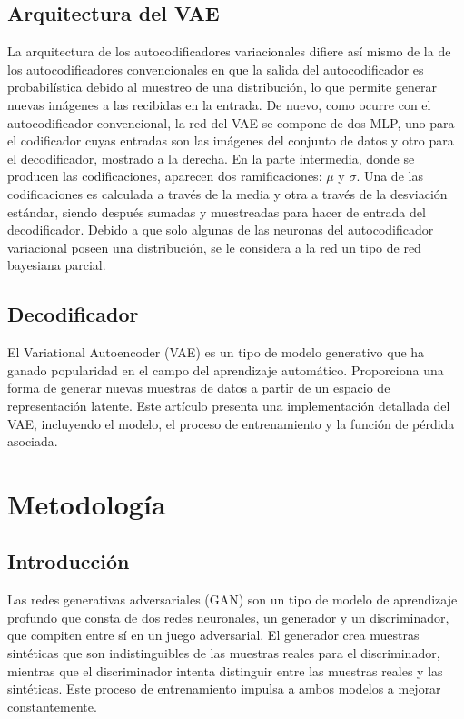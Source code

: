 \subsection{Arquitectura del VAE}\label{sec:arquitectura del vae}
La arquitectura de los autocodificadores variacionales difiere así mismo de la de
los autocodificadores convencionales en que la salida del autocodificador es
probabilística debido al muestreo de una distribución, lo que permite generar
nuevas imágenes a las recibidas en la entrada.
De nuevo, como ocurre con el autocodificador convencional, la red del VAE se
compone de dos MLP, uno para el codificador cuyas entradas son las imágenes del conjunto de datos y otro para el
decodificador, mostrado a la derecha. En la parte intermedia, donde se
producen las codificaciones, aparecen dos ramificaciones: \( \mu \) y \( \sigma \). Una de las
codificaciones es calculada a través de la media y otra a través de la desviación
estándar, siendo después sumadas y muestreadas para hacer de entrada del
decodificador.
Debido a que solo algunas de las neuronas del autocodificador variacional
poseen una distribución, se le considera a la red un tipo de red bayesiana
parcial.
\subsection{Decodificador}\label{sec:decodificador}
El Variational Autoencoder (VAE) es un tipo de modelo generativo que ha ganado popularidad en el campo del aprendizaje automático. Proporciona una forma de generar nuevas muestras de datos a partir de un espacio de representación latente. Este artículo presenta una implementación detallada del VAE, incluyendo el modelo, el proceso de entrenamiento y la función de pérdida asociada.

\newpage
\thispagestyle{empty} %
\mbox{} %
\section{Metodología}\label{sec:metodologia}

\subsection{Introducción}

Las redes generativas adversariales (GAN) son un tipo de modelo de aprendizaje profundo que consta de dos redes neuronales, un generador y un discriminador, que compiten entre sí en un juego adversarial. El generador crea muestras sintéticas que son indistinguibles de las muestras reales para el discriminador, mientras que el discriminador intenta distinguir entre las muestras reales y las sintéticas. Este proceso de entrenamiento impulsa a ambos modelos a mejorar constantemente.

